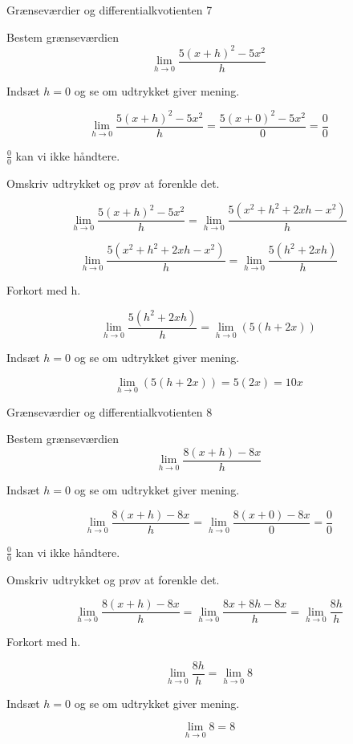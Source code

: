 \documentclass{article}
\begin{document}
\newpage
\begin{exercise}{Grænseværdier og differentialkvotienten 7}
	
	Bestem grænseværdien 
	\[
	\lim_{h \to 0} \frac{5(x+h)^2-5x^2}{h}
	\]
	
	
	\hint
	Indsæt $h=0$ og se om udtrykket giver mening.
	
	\hint
	\[
	\lim_{h \to 0} \frac{5(x+h)^2-5x^2}{h} = \frac{5(x+0)^2-5x^2}{0} = \frac{0}{0}
	\]
	
	\hint
	$\frac{0}{0}$ kan vi ikke håndtere.
	
	\hint
	Omskriv udtrykket og prøv at forenkle det.
	
	\hint
	\[
	\lim_{h \to 0} \frac{5(x+h)^2-5x^2}{h} = \lim_{h \to 0} \frac{5\left(x^2+h^2+2xh-x^2\right)}{h}
	\]
	
	\hint
	\[
	\lim_{h \to 0} \frac{5\left(x^2+h^2+2xh-x^2\right)}{h} = \lim_{h \to 0} \frac{5\left(h^2+2xh\right)}{h}
	\]
	
	\hint
	Forkort med h.
	
	\hint
	\[
	\lim_{h \to 0} \frac{5\left(h^2+2xh\right)}{h} = \lim_{h \to 0} \left(5(h + 2x)\right)
	\]
	
	\hint
	Indsæt $h=0$ og se om udtrykket giver mening.
	
	\hint
	\[
	\lim_{h \to 0} \left(5(h + 2x)\right) = 5(2x) = 10x
	\]
	
\end{exercise}

\newpage
\begin{exercise}{Grænseværdier og differentialkvotienten 8}
	
	Bestem grænseværdien 
	\[
	\lim_{h \to 0} \frac{8(x+h)-8x}{h}
	\]
	
	
	\hint
	Indsæt $h=0$ og se om udtrykket giver mening.
	
	\hint
	\[
	\lim_{h \to 0} \frac{8(x+h)-8x}{h}  =	\lim_{h \to 0} \frac{8(x+0)-8x}{0} = \frac{0}{0}
	\]
	
	\hint
	$\frac{0}{0}$ kan vi ikke håndtere.
	
	\hint
	Omskriv udtrykket og prøv at forenkle det.
	
	\hint
	\[
	\lim_{h \to 0} \frac{8(x+h)-8x}{h} =  \lim_{h \to 0} \frac{8x+8h-8x}{h} = \lim_{h \to 0} \frac{8h}{h}
	\]
	
	\hint
	Forkort med h.
	
	\hint
	\[
	\lim_{h \to 0} \frac{8h}{h} = \lim_{h \to 0} 8
	\]
	
	\hint
	Indsæt $h=0$ og se om udtrykket giver mening.
	
	\hint
	\[
	\lim_{h \to 0} 8 = 8
	\]
	
\end{exercise}


\newpage
\end{document}
